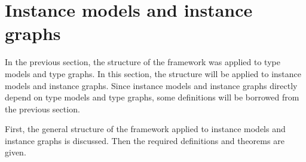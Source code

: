 \section{Instance models and instance graphs}
\label{sec:transformation_framework:instance_models_and_instance_graphs}

In the previous section, the structure of the framework was applied to type models and type graphs. In this section, the structure will be applied to instance models and instance graphs. Since instance models and instance graphs directly depend on type models and type graphs, some definitions will be borrowed from the previous section.

First, the general structure of the framework applied to instance models and instance graphs is discussed. Then the required definitions and theorems are given.


